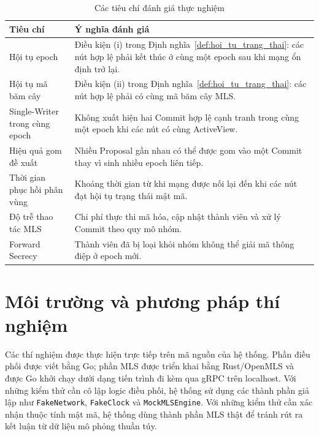 \documentclass[../DoAn.tex]{subfiles}
\begin{document}
	\begin{table}[htbp]
		\centering
		\caption{Các tiêu chí đánh giá thực nghiệm}
		\label{tab:tham_so_danh_gia}
		\begin{tabular}{|p{4.2cm}|p{9.5cm}|}
			\hline
			\textbf{Tiêu chí} & \textbf{Ý nghĩa đánh giá} \\
			\hline
			Hội tụ epoch & Điều kiện (i) trong Định nghĩa~\ref{def:hoi_tu_trang_thai}: các nút hợp lệ phải kết thúc ở cùng một epoch sau khi mạng ổn định trở lại. \\
			\hline
			Hội tụ mã băm cây & Điều kiện (ii) trong Định nghĩa~\ref{def:hoi_tu_trang_thai}: các nút hợp lệ phải có cùng mã băm cây MLS. \\
			\hline
			Single-Writer trong cùng epoch & Không xuất hiện hai Commit hợp lệ cạnh tranh trong cùng một epoch khi các nút có cùng ActiveView. \\
			\hline
			Hiệu quả gom đề xuất & Nhiều Proposal gần nhau có thể được gom vào một Commit thay vì sinh nhiều epoch liên tiếp. \\
			\hline
			Thời gian phục hồi phân vùng & Khoảng thời gian từ khi mạng được nối lại đến khi các nút đạt hội tụ trạng thái mật mã. \\
			\hline
			Độ trễ thao tác MLS & Chi phí thực thi mã hóa, cập nhật thành viên và xử lý Commit theo quy mô nhóm. \\
			\hline
			Forward Secrecy & Thành viên đã bị loại khỏi nhóm không thể giải mã thông điệp ở epoch mới. \\
			\hline
		\end{tabular}
	\end{table}
	
	\section{Môi trường và phương pháp thí nghiệm}
	\label{sec:moi_truong_phuong_phap}
	
Các thí nghiệm được thực hiện trực tiếp trên mã nguồn của hệ thống. Phần điều phối được viết bằng Go; phần MLS được triển khai bằng Rust/OpenMLS \cite{openmls2026doc} và được Go khởi chạy dưới dạng tiến trình đi kèm qua gRPC \cite{grpc2026doc} trên localhost. Với những kiểm thử cần cô lập logic điều phối, hệ thống sử dụng các thành phần giả lập như \texttt{FakeNetwork}, \texttt{FakeClock} và \texttt{MockMLSEngine}. Với những kiểm thử cần xác nhận thuộc tính mật mã, hệ thống dùng thành phần MLS thật để tránh rút ra kết luận từ dữ liệu mô phỏng thuần túy.
	
\end{document}
